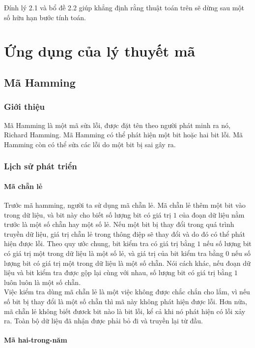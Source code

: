 \documentclass[14pt]{extreport}
\begin{document}
Đính lý 2.1 và bổ đề 2.2 giúp khẳng định rằng thuật toán trên sẽ dừng sau một số hữu hạn bước tính toán.

\chapter{Ứng dụng của lý thuyết mã}
\section{Mã Hamming}
\subsection{Giới thiệu}
Mã Hamming là một mã sửa lỗi, được đặt tên theo người phát minh ra nó, Richard Hamming. Mã Hamming có thể phát hiện một bit hoặc hai bit lỗi. Mã Hamming còn có thể sửa các lỗi do một bit bị sai gây ra.
\subsection{Lịch sử phát triển}
\subsubsection{Mã chẵn lẻ}

Trước mã hamming, người ta sử dụng mã chẵn lẻ. Mã chẵn lẻ thêm một bit vào trong dữ liệu, và bit này cho biết số lượng bit có giá trị $1$ của đoạn dữ liệu nằm trước là một số chẵn hay một số lẻ. Nếu một bit bị thay đổi trong quá trình truyền dữ liệu, giá trị chẵn lẻ trong thông điệp sẽ thay đổi và do đó có thể phát hiện được lỗi. Theo quy ước chung, bit kiểm tra có giá trị bằng $1$ nếu số lượng bit có giá trị một trong dữ liệu là một số lẻ, và giá trị của bit kiểm tra bằng $0$ nếu số lượng bit có giá trị một trong dữ liệu là một số chẵn. Nói cách khác, nếu đoạn dữ liệu và bit kiểm tra được gộp lại cùng với nhau, số lượng bit có giá trị bằng $1$ luôn luôn là một số chẵn.\\

Việc kiểm tra dùng mã chẵn lẻ là một việc không được chắc chắn cho lắm, vì nếu số bit bị thay đổi là một số chẵn thì mã này không phát hiện được lỗi. Hơn nữa, mã chẵn lẻ không biết đươck bit nào là bit lỗi, kể cả khi nó phát hiện có lỗi xảy ra. Toàn bộ dữ liệu đã nhận được phải bỏ đi và truyền lại từ đầu. 
\subsubsection{Mã hai-trong-năm}
\end{document}

